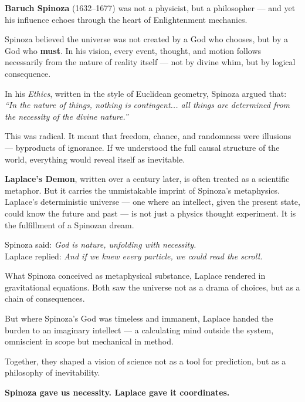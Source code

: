 \begin{tcolorbox}[colback=gray!5!white, colframe=black!75!white, title={Historical Sidebar: Spinoza and the God of Necessity}]

    \textbf{Baruch Spinoza} (1632–1677) was not a physicist, but a philosopher — and yet his influence echoes through the heart of Enlightenment mechanics.
    
    Spinoza believed the universe was not created by a God who chooses, but by a God who \textbf{must}. In his vision, every event, thought, and motion follows necessarily from the nature of reality itself — not by divine whim, but by logical consequence.
    
    \medskip
    
    In his \textit{Ethics}, written in the style of Euclidean geometry, Spinoza argued that:
        \textit{“In the nature of things, nothing is contingent... all things are determined from the necessity of the divine nature.”}
    
    This was radical. It meant that freedom, chance, and randomness were illusions — byproducts of ignorance. If we understood the full causal structure of the world, everything would reveal itself as inevitable.
    
    \medskip
    
    \textbf{Laplace’s Demon}, written over a century later, is often treated as a scientific metaphor. But it carries the unmistakable imprint of Spinoza’s metaphysics. Laplace’s deterministic universe — one where an intellect, given the present state, could know the future and past — is not just a physics thought experiment. It is the fulfillment of a Spinozan dream.
    
        Spinoza said: \textit{God is nature, unfolding with necessity.} \\
        Laplace replied: \textit{And if we knew every particle, we could read the scroll.}
    
    What Spinoza conceived as metaphysical substance, Laplace rendered in gravitational equations. Both saw the universe not as a drama of choices, but as a chain of consequences.
    
    \medskip
    
    But where Spinoza’s God was timeless and immanent, Laplace handed the burden to an imaginary intellect — a calculating mind outside the system, omniscient in scope but mechanical in method.
    
    Together, they shaped a vision of science not as a tool for prediction, but as a philosophy of inevitability.
    
    \medskip
    
    \textbf{Spinoza gave us necessity. Laplace gave it coordinates.}
    
    \end{tcolorbox}
   
